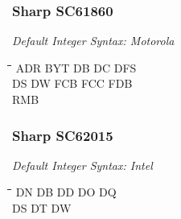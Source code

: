 \subsubsection{Sharp SC61860}

{\em Default Integer Syntax: Motorola}

{\tt\begin{tabbing}
\hspace{3cm}\=\hspace{3cm}\=\hspace{3cm}\=\hspace{3cm}\=\kill
ADR        \> BYT         \> DB          \> DC          \> DFS \\
DS         \> DW          \> FCB         \> FCC         \> FDB \\
RMB \\
\end{tabbing}}

\subsubsection{Sharp SC62015}

{\em Default Integer Syntax: Intel}

{\tt\begin{tabbing}
\hspace{3cm}\=\hspace{3cm}\=\hspace{3cm}\=\hspace{3cm}\=\kill
DN         \> DB          \> DD          \> DO          \> DQ \\
DS         \> DT          \> DW \\
\end{tabbing}}